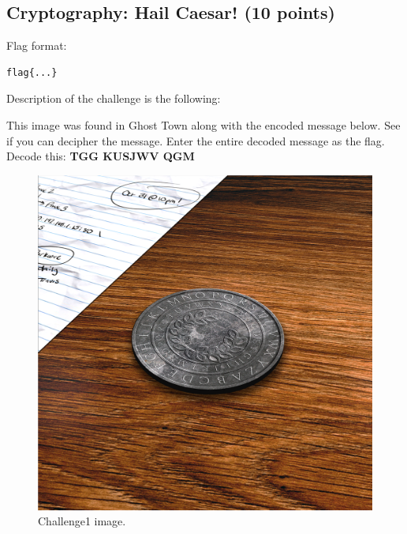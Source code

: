 \documentclass[11 pt]{article}
\begin{document}
\subsection{Cryptography: Hail Caesar! (10 points)}
Flag format:
\begin{lstlisting}
flag{...}
\end{lstlisting}
Description of the challenge is the following:
\begin{tcolorbox}
This image was found in Ghost Town along with the encoded message below. See if you can decipher the message. Enter the entire decoded message as the flag.
\newline
Decode this: \textbf{TGG KUSJWV QGM}
\end{tcolorbox}
\begin{figure}[H]
    \centering
    \includegraphics[width=0.6\linewidth]{challenge1.png}
    \caption{Challenge1 image.}
    \label{fig:challenge1}
\end{figure}

\end{document}
